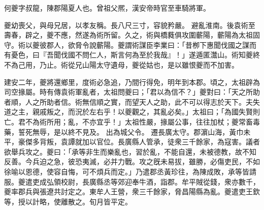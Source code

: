 \begin{pinyinscope}
 
 
 何夔字叔龍，陳郡陽夏人也。曾祖父熈，漢安帝時官至車騎將軍。
 
 
 夔幼喪父，與母兄居，以孝友稱。長八尺三寸，容貌矜嚴。
 避亂淮南。後袁術至壽春，辟之，夔不應，然遂為術所留。久之，術與橋蕤俱攻圍蘄陽，蘄陽為太祖固守。術以夔彼郡人，欲脅令說蘄陽。夔謂術謀臣李業曰：「昔栁下惠聞伐國之謀而有憂色，曰『吾聞伐國不問仁人，斯言何為至於我哉』！」遂遁匿灊山。術知夔終不為己用，乃止。術從兄山陽太守遺母，夔從姑也，是以雖恨夔而不加害。
 
 
建安二年，夔將還鄉里，度術必急追，乃間行得免，明年到本郡。頃之，太祖辟為司空掾屬。時有傳袁術軍亂者，太祖問夔曰；「君以為信不？」夔對曰：「天之所助者順，人之所助者信。術無信順之實，而望天人之助，此不可以得志於天下。夫失道之主，親戚叛之，而況於左右乎！以夔觀之，其亂必矣。」太祖曰；「為國失賢則亡。君不為術所用；亂，不亦宜乎！」太祖性嚴，掾屬公事，往往加杖；夔常畜毒藥，誓死無辱，是以終不見及。
 出為城父令。
 遷長廣太守。郡濵山海，黃巾未平，豪傑多背叛，袁譚就加以官位。長廣縣人管承，徒衆三千餘家，為寇害。議者欲舉兵攻之。夔曰：「承等非生而樂亂也，習於亂，不能自還，未被德教，故不知反善。今兵迫之急，彼恐夷滅，必并力戰。攻之旣未易拔，雖勝，必傷吏民，不如徐喻以恩德，使容自悔，可不煩兵而定。」乃遣郡丞黃珍往，為陳成敗，承等皆請服。夔遣吏成弘領校尉，長廣縣丞等郊迎奉牛酒，詣郡。牟平賊從錢，衆亦數千，夔率郡兵與張遼共討定之。東牟人王營，衆三千餘家，脅昌陽縣為亂。夔遣吏王欽等，授以計略，使離散之。旬月皆平定。
 
 
 

\end{pinyinscope}
